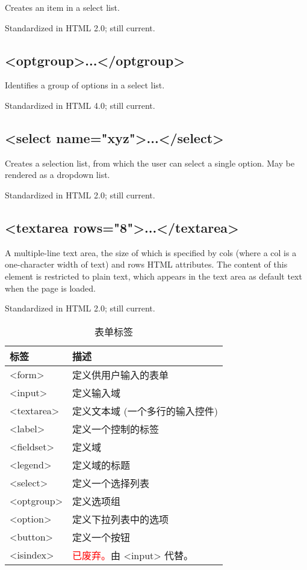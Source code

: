 Creates an item in a select list.


Standardized in HTML 2.0; still current.


\subsection{<optgroup>...</optgroup>}

Identifies a group of options in a select list.


Standardized in HTML 4.0; still current.

\subsection{<select name="xyz">...</select>}

Creates a selection list, from which the user can select a single option. May be rendered as a dropdown list.

Standardized in HTML 2.0; still current.



\subsection{<textarea rows="8">...</textarea>}

A multiple-line text area, the size of which is specified by cols (where a col is a one-character width of text) and rows HTML attributes. The content of this element is restricted to plain text, which appears in the text area as default text when the page is loaded.

Standardized in HTML 2.0; still current.



\begin{table}[!h]
\centering
\caption{表单标签}
\begin{tabular}{|l|l|}
\hline
标签		&描述\\
\hline
<form>	&定义供用户输入的表单\\
\hline
<input>	&定义输入域\\
\hline
<textarea>&	定义文本域 (一个多行的输入控件)\\
\hline
<label>	&定义一个控制的标签\\
\hline
<fieldset>&	定义域\\
\hline
<legend>	&定义域的标题\\
\hline
<select>	&定义一个选择列表\\
\hline
<optgroup>&	定义选项组\\
\hline
<option>	&定义下拉列表中的选项\\
\hline
<button>	&定义一个按钮\\
\hline
<isindex>	&\textcolor{Red}{已废弃。}由 <input> 代替。\\
\hline
\end{tabular}
\end{table}

